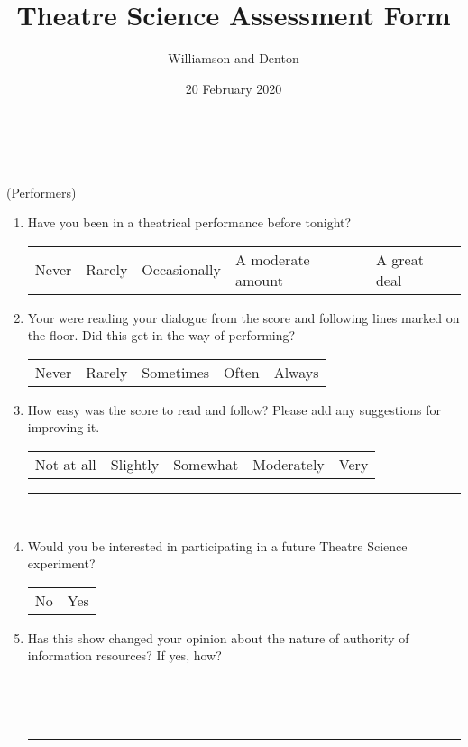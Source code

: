 \documentclass[12pt]{extarticle}
\title{Theatre Science Assessment Form}
\author{Williamson and Denton}
\date{20 February 2020}
\begin{document}
\thispagestyle{empty}

\begin{center}
  \\
  \vspace{0.3cm}
  \\
  \vspace{0.3cm}
  (Performers)
  \vspace{0.5cm}
\end{center}

\begin{enumerate}

  \item Have you been in a theatrical performance before tonight?

  \begin{tabular}{l|l|l|l|l}
    Never & Rarely & Occasionally & A moderate amount & A great deal
  \end{tabular}

  \item Your were reading your dialogue from the score and following lines marked on the floor.  Did this get in the way of performing?

  \begin{tabular}{l|l|l|l|l}
    Never &  Rarely & Sometimes & Often & Always
  \end{tabular}

  \item How easy was the score to read and follow?  Please add any suggestions for improving it.

    \begin{tabular}{l|l|l|l|l}
    Not at all & Slightly & Somewhat & Moderately & Very
  \end{tabular}

  \vspace{0.5cm}
  \rule{6in}{1pt}\\

  \item Would you be interested in participating in a future Theatre Science experiment?

    \begin{tabular}{l|l}
    No & Yes
    \end{tabular}

  \item Has this show changed your opinion about the nature of authority of information resources?   If yes, how?

  \vspace{0.5cm}
  \rule{6in}{1pt}\\
  \vspace{0.5cm}\\
  \rule{6in}{1pt}


\end{enumerate}
\end{document}
